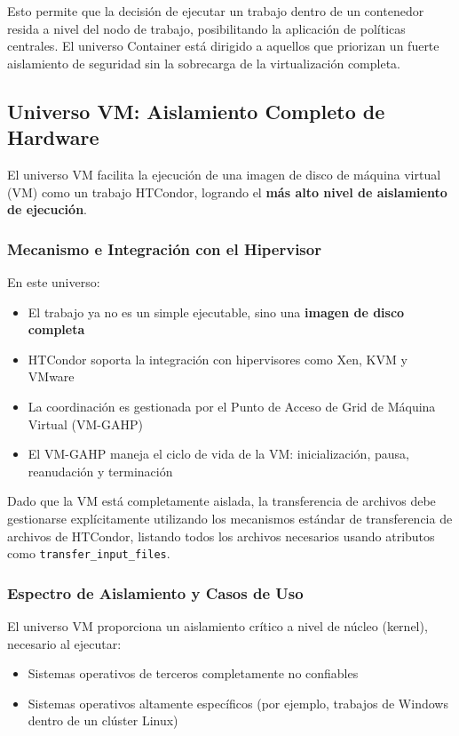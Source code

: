 Esto permite que la decisión de ejecutar un trabajo dentro de un contenedor resida a nivel del nodo de trabajo, posibilitando la aplicación de políticas centrales. El universo Container está dirigido a aquellos que priorizan un fuerte aislamiento de seguridad sin la sobrecarga de la virtualización completa.

\subsection{Universo VM: Aislamiento Completo de Hardware}

El universo VM facilita la ejecución de una imagen de disco de máquina virtual (VM) como un trabajo HTCondor, logrando el \textbf{más alto nivel de aislamiento de ejecución}.

\subsubsection{Mecanismo e Integración con el Hipervisor}

En este universo:

\begin{itemize}
	\item El trabajo ya no es un simple ejecutable, sino una \textbf{imagen de disco completa}
	\item HTCondor soporta la integración con hipervisores como Xen, KVM y VMware
	\item La coordinación es gestionada por el Punto de Acceso de Grid de Máquina Virtual (VM-GAHP)
	\item El VM-GAHP maneja el ciclo de vida de la VM: inicialización, pausa, reanudación y terminación
\end{itemize}

Dado que la VM está completamente aislada, la transferencia de archivos debe gestionarse explícitamente utilizando los mecanismos estándar de transferencia de archivos de HTCondor, listando todos los archivos necesarios usando atributos como \texttt{transfer\_input\_files}.

\subsubsection{Espectro de Aislamiento y Casos de Uso}

El universo VM proporciona un aislamiento crítico a nivel de núcleo (kernel), necesario al ejecutar:

\begin{itemize}
	\item Sistemas operativos de terceros completamente no confiables
	\item Sistemas operativos altamente específicos (por ejemplo, trabajos de Windows dentro de un clúster Linux)
\end{itemize}

